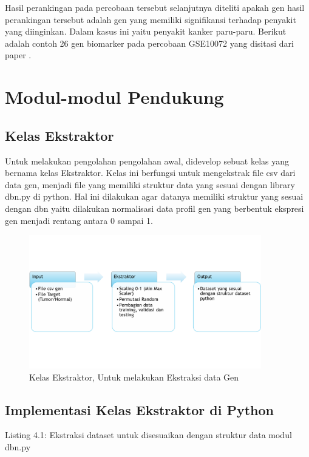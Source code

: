 Hasil perankingan pada percobaan tersebut selanjutnya diteliti apakah gen hasil perankingan tersebut adalah gen yang memiliki signifikansi terhadap penyakit yang diinginkan. Dalam kasus ini yaitu penyakit kanker paru-paru. Berikut adalah contoh 26 gen biomarker pada percobaan GSE10072 yang disitasi dari paper \citep{landi2008gene}. 

\section{Modul-modul Pendukung}
\subsection{Kelas Ekstraktor}
Untuk melakukan pengolahan pengolahan awal, didevelop sebuat kelas yang bernama kelas Ekstraktor. Kelas ini berfungsi untuk mengekstrak file csv dari data gen, menjadi file yang memiliki struktur data yang sesuai dengan library dbn.py di python. Hal ini dilakukan agar datanya memiliki struktur yang sesuai dengan dbn yaitu dilakukan normalisasi data profil gen yang berbentuk ekspresi gen menjadi rentang antara 0 sampai 1.

\begin{figure}
	\centering
	\includegraphics[width=0.9\textwidth]
		{pics/ekstraktor.png}
	\caption{Kelas Ekstraktor, Untuk melakukan Ekstraksi data Gen}
	\label{fig:preproses}
\end{figure}

\newpage
\subsection{Implementasi Kelas Ekstraktor di Python}
Listing 4.1: Ekstraksi dataset untuk disesuaikan dengan struktur data modul dbn.py


